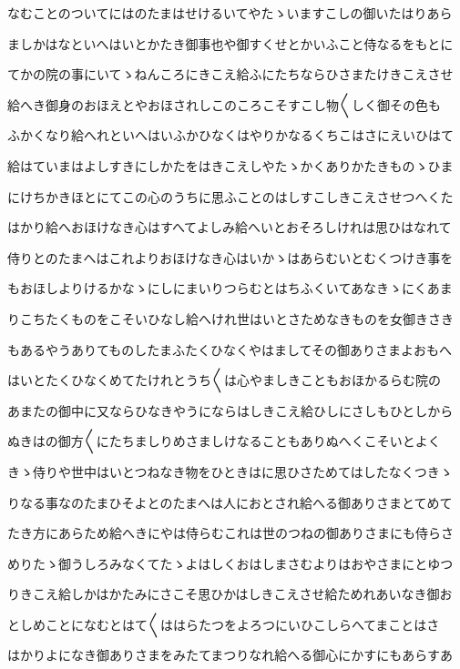 \documentclass[a4paper,11pt,landscape]{ltjtarticle}
\begin{document}
なむことのついてにはのたまはせけるいてやたゝいますこしの御いたはりあら
\par\medskip
ましかはなといへはいとかたき御事也や御すくせとかいふこと侍なるをもとに
\par\medskip
てかの院の事にいてゝねんころにきこえ給ふにたちならひさまたけきこえさせ
\par\medskip
給へき御身のおほえとやおほされしこのころこそすこし物〱しく御その色も
\par\medskip
ふかくなり給へれといへはいふかひなくはやりかなるくちこはさにえいひはて
\par\medskip
給はていまはよしすきにしかたをはきこえしやたゝかくありかたきものゝひま
\par\medskip
にけちかきほとにてこの心のうちに思ふことのはしすこしきこえさせつへくた
\par\medskip
はかり給へおほけなき心はすへてよしみ給へいとおそろしけれは思ひはなれて
\par\medskip
侍りとのたまへはこれよりおほけなき心はいかゝはあらむいとむくつけき事を
\par\medskip
もおほしよりけるかなゝにしにまいりつらむとはちふくいてあなきゝにくあま
\par\medskip
りこちたくものをこそいひなし給へけれ世はいとさためなきものを女御きさき
\par\medskip
もあるやうありてものしたまふたくひなくやはましてその御ありさまよおもへ
\par\medskip
はいとたくひなくめてたけれとうち〱は心やましきこともおほかるらむ院の
\par\medskip
あまたの御中に又ならひなきやうにならはしきこえ給ひしにさしもひとしから
\par\medskip
ぬきはの御方〱にたちましりめさましけなることもありぬへくこそいとよく
\par\medskip
きゝ侍りや世中はいとつねなき物をひときはに思ひさためてはしたなくつきゝ
\par\medskip
りなる事なのたまひそよとのたまへは人におとされ給へる御ありさまとてめて
\par\medskip
たき方にあらため給へきにやは侍らむこれは世のつねの御ありさまにも侍らさ
\par\medskip
めりたゝ御うしろみなくてたゝよはしくおはしまさむよりはおやさまにとゆつ
\par\medskip
りきこえ給しかはかたみにさこそ思ひかはしきこえさせ給ためれあいなき御お
\par\medskip
としめことになむとはて〱ははらたつをよろつにいひこしらへてまことはさ
\par\medskip
はかりよになき御ありさまをみたてまつりなれ給へる御心にかすにもあらすあ
\end{document}
